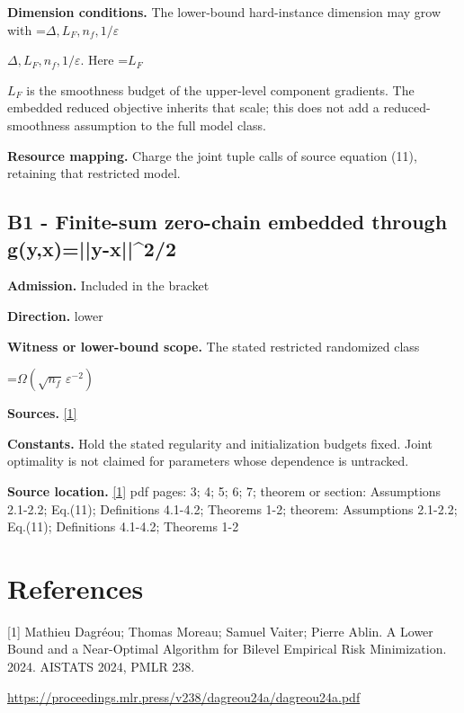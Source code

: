 \documentclass[10pt,a4paper]{article}
\newcommand{\AtlasMath}[1]{\par\begingroup\centering\setbox0=\hbox{$\displaystyle #1$}\ifdim\wd0>1.4\linewidth\typeout{ATLAS WIDE FORMULA: \the\wd0}\fi\ifdim\wd0>\linewidth\resizebox{\linewidth}{!}{\box0}\else\box0\fi\par\endgroup}
\newcommand{\AtlasInlineMath}[1]{\begingroup\setbox0=\hbox{$#1$}\ifdim\wd0>.4\linewidth\endgroup\AtlasMath{#1}\else\endgroup$#1$\fi}
\begin{document}
\textbf{Dimension conditions.} The lower-bound hard-instance dimension may grow with \AtlasInlineMath{\Delta,L_F,n_f,1/\varepsilon}. Here \AtlasInlineMath{L_F} is the smoothness budget of the upper-level component gradients. The embedded reduced objective inherits that scale; this does not add a reduced-smoothness assumption to the full model class.

\textbf{Resource mapping.} Charge the joint tuple calls of source equation (11), retaining that restricted model.

\subsection{B1 - Finite-sum zero-chain embedded through g(y,x)=||y-x||\textasciicircum{}2/2}
\textbf{Admission.} Included in the bracket

\textbf{Direction.} lower

\textbf{Witness or lower-bound scope.} The stated restricted randomized class

\AtlasMath{\Omega(\sqrt{n_f}\,\varepsilon^{-2})}
\textbf{Sources.} \href{https://proceedings.mlr.press/v238/dagreou24a/dagreou24a.pdf}{[1]}

\textbf{Constants.} Hold the stated regularity and initialization budgets fixed. Joint optimality is not claimed for parameters whose dependence is untracked.

\textbf{Source location.} \href{https://proceedings.mlr.press/v238/dagreou24a/dagreou24a.pdf}{[1]} pdf pages: 3; 4; 5; 6; 7; theorem or section: Assumptions 2.1-2.2; Eq.(11); Definitions 4.1-4.2; Theorems 1-2; theorem: Assumptions 2.1-2.2; Eq.(11); Definitions 4.1-4.2; Theorems 1-2

\section{References}
[1] Mathieu Dagréou; Thomas Moreau; Samuel Vaiter; Pierre Ablin. A Lower Bound and a Near-Optimal Algorithm for Bilevel Empirical Risk Minimization. 2024. AISTATS 2024, PMLR 238.

\url{https://proceedings.mlr.press/v238/dagreou24a/dagreou24a.pdf}
\end{document}
